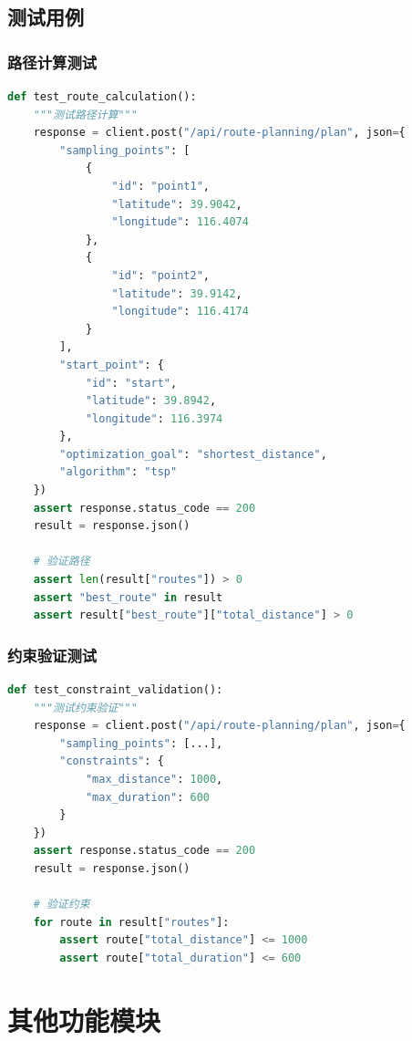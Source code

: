 \documentclass[12pt,a4paper,openany]{report}
\begin{document}
\subsection{测试用例}

\subsubsection{路径计算测试}

\begin{lstlisting}[language=Python, caption=路径计算测试]
def test_route_calculation():
    """测试路径计算"""
    response = client.post("/api/route-planning/plan", json={
        "sampling_points": [
            {
                "id": "point1",
                "latitude": 39.9042,
                "longitude": 116.4074
            },
            {
                "id": "point2",
                "latitude": 39.9142,
                "longitude": 116.4174
            }
        ],
        "start_point": {
            "id": "start",
            "latitude": 39.8942,
            "longitude": 116.3974
        },
        "optimization_goal": "shortest_distance",
        "algorithm": "tsp"
    })
    assert response.status_code == 200
    result = response.json()

    # 验证路径
    assert len(result["routes"]) > 0
    assert "best_route" in result
    assert result["best_route"]["total_distance"] > 0
\end{lstlisting}

\subsubsection{约束验证测试}

\begin{lstlisting}[language=Python, caption=约束验证测试]
def test_constraint_validation():
    """测试约束验证"""
    response = client.post("/api/route-planning/plan", json={
        "sampling_points": [...],
        "constraints": {
            "max_distance": 1000,
            "max_duration": 600
        }
    })
    assert response.status_code == 200
    result = response.json()

    # 验证约束
    for route in result["routes"]:
        assert route["total_distance"] <= 1000
        assert route["total_duration"] <= 600
\end{lstlisting}

\section{其他功能模块}
\end{document}
